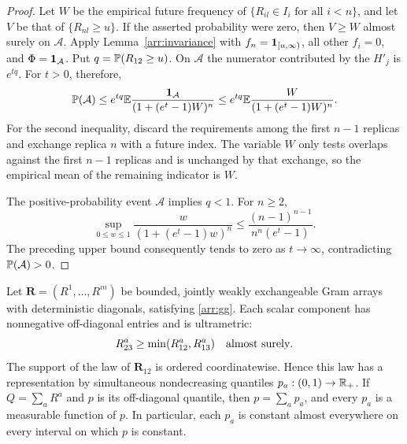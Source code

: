 \begin{proof}
Let $W$ be the empirical future frequency of
$\{R_{il}\in I_i\text{ for all }i<n\}$, and let $V$ be that of
$\{R_{nl}\geq u\}$. If the asserted probability were zero, then
$V\geq W$ almost surely on $\mathcal A$. Apply
Lemma~\ref{arr:invariance} with
$f_n=\mathbf 1_{[u,\infty)}$, all other $f_i=0$, and
$\Phi=\mathbf 1_{\mathcal A}$. Put $q=\mathbb P(R_{12}\geq u)$.
On $\mathcal A$ the numerator contributed by the $H'_j$ is $e^{tq}$.
For $t>0$, therefore,
\[
 \mathbb P(\mathcal A)
 \leq e^{tq}\mathbb E\frac{\mathbf 1_{\mathcal A}}
                         {(1+(e^t-1)W)^n}
 \leq e^{tq}\mathbb E\frac{W}{(1+(e^t-1)W)^n}.
\]
For the second inequality, discard the requirements among the first
$n-1$ replicas and exchange replica $n$ with a future index. The variable
$W$ only tests overlaps against the first $n-1$ replicas and is unchanged
by that exchange, so the empirical mean of the remaining indicator is
$W$.

The positive-probability event $\mathcal A$ implies $q<1$. For $n\geq2$,
\[
 \sup_{0\leq w\leq1}\frac{w}{(1+(e^t-1)w)^n}
 \leq \frac{(n-1)^{n-1}}{n^n(e^t-1)}.
\]
The preceding upper bound consequently tends to zero as $t\to\infty$,
contradicting $\mathbb P(\mathcal A)>0$.
\end{proof}

\begin{proposition}\label{arr:structure}
Let $\mathbf R=(R^1,\ldots,R^m)$ be bounded, jointly weakly exchangeable
Gram arrays with deterministic diagonals, satisfying
\eqref{arr:gg}. Each scalar component has nonnegative off-diagonal
entries and is ultrametric:
\[
 R^a_{23}\geq\min(R^a_{12},R^a_{13})\quad\hbox{almost surely}.
\]
The support of the law of $\mathbf R_{12}$ is ordered coordinatewise.
Hence this law has a representation by simultaneous nondecreasing
quantiles $p_a:(0,1)\to\mathbb R_+$. If $Q=\sum_a R^a$ and $p$ is its
off-diagonal quantile, then $p=\sum_a p_a$, and every $p_a$ is a
measurable function of $p$. In particular, each $p_a$ is constant almost
everywhere on every interval on which $p$ is constant.
\end{proposition}

